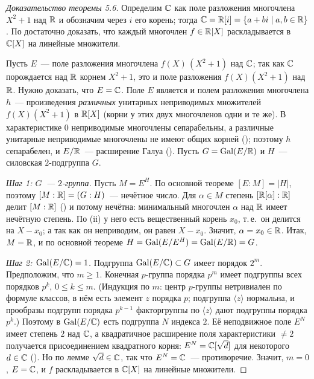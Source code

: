 \begin{proof}[Доказательство теоремы 5.6]
Определим $\mathbb C$ как поле разложения многочлена $X^2+1$ над $\mathbb R$ и обозначим через $i$ его корень; тогда
$\mathbb C=\mathbb R[i]=\{a+bi\mid a,b\in\mathbb R\}$. По  достаточно доказать, что каждый многочлен $f\in\mathbb R[X]$ раскладывается в
$\mathbb C[X]$ на линейные множители.

Пусть $E$~--- поле разложения многочлена $f(X)\,(X^2+1)$ над $\mathbb C$; так как $\mathbb C$ порождается над $\mathbb R$ корнем $X^2+1$,
это и поле разложения $f(X)(X^2+1)$ над $\mathbb R$. Нужно доказать, что $E=\mathbb C$. Поле $E$ является и полем разложения
многочлена $h$~--- произведения \emph{различных} унитарных неприводимых множителей $f(X)(X^2+1)$ в $\mathbb R[X]$ (корни у этих
двух многочленов одни и те же). В характеристике $0$ неприводимые многочлены сепарабельны, а различные унитарные
неприводимые многочлены не имеют общих корней (); поэтому $h$ сепарабелен, и $E/\mathbb R$~--- расширение Галуа ().
Пусть $G=\operatorname{Gal}(E/\mathbb R)$ и $H$~--- силовская $2$-подгруппа $G$.

\emph{Шаг 1: $G$~--- $2$-группа.} Пусть $M=E^H$. По основной теореме $[E:M]=|H|$, поэтому $[M:\mathbb R]=(G:H)$~--- нечётное
число. Для $\alpha\in M$ степень $[\mathbb R[\alpha]:\mathbb R]$ делит $[M:\mathbb R]$ () и потому нечётна: минимальный многочлен
$\alpha$ над $\mathbb R$ имеет нечётную степень. По (ii) у него есть вещественный корень $x_0$, т.\,е.\ он делится на $X-x_0$; а
так как он неприводим, он равен $X-x_0$. Значит, $\alpha=x_0\in\mathbb R$. Итак, $M=\mathbb R$, и по основной теореме
$H=\operatorname{Gal}(E/E^H)=\operatorname{Gal}(E/\mathbb R)=G$.

\emph{Шаг 2: $\operatorname{Gal}(E/\mathbb C)=1$.} Подгруппа $\operatorname{Gal}(E/\mathbb C)\subset G$ имеет порядок $2^m$. Предположим, что $m\ge1$. Конечная
$p$-группа порядка $p^m$ имеет подгруппы всех порядков $p^k$, $0\le k\le m$. (Индукция по $m$: центр $p$-группы
нетривиален по формуле классов, в нём есть элемент $z$ порядка $p$; подгруппа $\langle z\rangle$ нормальна, и прообразы
подгрупп порядка $p^{k-1}$ факторгруппы по $\langle z\rangle$ дают подгруппы порядка $p^k$.) Поэтому в $\operatorname{Gal}(E/\mathbb C)$ есть
подгруппа $N$ индекса $2$. Её неподвижное поле $E^N$ имеет степень $2$ над $\mathbb C$, а квадратичное расширение поля
характеристики $\ne2$ получается присоединением квадратного корня: $E^N=\mathbb C[\sqrt d]$ для некоторого $d\in\mathbb C$ ().
Но по лемме  $\sqrt d\in\mathbb C$, так что $E^N=\mathbb C$~--- противоречие. Значит, $m=0$, $E=\mathbb C$, и $f$ раскладывается в
$\mathbb C[X]$ на линейные множители.
\end{proof}

